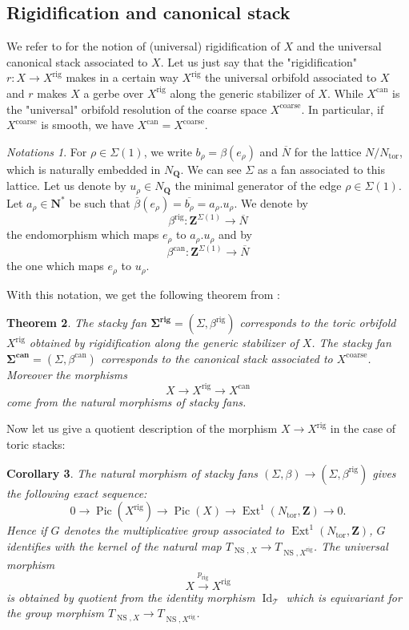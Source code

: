 \documentclass{proc-l}
\newcommand{\Z}{\mathbf{Z}}
\newcommand{\N}{\mathbf{N}}
\newcommand{\Q}{\mathbf{Q}}
\DeclareMathOperator{\Pic}{Pic}
\DeclareMathOperator{\can}{can}
\DeclareMathOperator{\id}{Id}
\DeclareMathOperator{\Ext}{Ext}
\DeclareMathOperator{\NS}{NS}
\DeclareMathOperator{\coarse}{coarse}
\DeclareMathOperator{\tor}{tor}
\DeclareMathOperator{\rig}{rig}
\newcommand{\stackT}{\mathcal{T}}
\newtheorem{theorem}{Theorem}[section]
\newtheorem{cor}[theorem]{Corollary}
\theoremstyle{definition}
\theoremstyle{remark}
\newtheorem{Notations}[theorem]{Notations}
\numberwithin{equation}{section}
\begin{document}
\subsection{Rigidification and canonical stack}

We refer to \cite[section 1.4, section 4.1]{fantechi_toric_stack} for the notion of (universal) rigidification of $X$ and the universal canonical stack associated to $X$. Let us just say that the "rigidification" $r : X \rightarrow X^{\rig}$ makes in a certain way $X^{\rig}$ the universal orbifold associated to $X$ and $r$ makes $X$ a gerbe over $X^{\rig}$ along the generic stabilizer of $X$. While $X^{\can}$ is the "universal" orbifold resolution of the coarse space $X^{\coarse}$. In particular, if $X^{\coarse}$ is smooth, we have $X^{\can} = X^{\coarse}$.

\begin{Notations}\label{notation_stacky_fan_beta}
    For $\rho \in \Sigma(1)$, we write $b_ {\rho} = \beta(e_{\rho})$ and $\overline{N}$ for  the lattice $N / N_{\tor}$, which is naturally embedded in $N_{\Q}$. We can see $\Sigma$ as a fan associated to this lattice. Let us denote by $u_{\rho} \in N_{\Q}$ the minimal generator of the edge $\rho \in \Sigma(1)$. Let $a_{\rho} \in \N^*$ be such that $\overline{\beta}(e_{\rho}) = \overline{b_{\rho}} = a_{\rho} . u_{\rho}$. We denote by $$\beta^{\rig} : \Z^{\Sigma(1)} \rightarrow \overline{N}$$ the endomorphism which maps $e_{\rho}$ to $a_{\rho} . u_{\rho}$ and by $$\beta^{\can} : \Z^{\Sigma(1)} \rightarrow \overline{N}$$ the one which maps $e_{\rho}$ to $ u_{\rho}$.
\end{Notations}

With this notation, we get the following theorem from \cite[Paragraph 7.2]{fantechi_toric_stack}:

\begin{theorem}
    The stacky fan $\mathbf{\Sigma^{\rig}} = (\Sigma,\beta^{\rig})$ corresponds to the toric orbifold $X^{\rig}$ obtained by rigidification along the generic stabilizer of $X$. The stacky fan $\mathbf{\Sigma^{\can}} = (\Sigma,\beta^{\can})$ corresponds to the canonical stack associated to $X^{\coarse}$. Moreover the morphisms $$X \rightarrow X^{\rig} \rightarrow X^{\can} $$ come from the natural morphisms of stacky fans.
\end{theorem}

Now let us give a quotient description of the morphism $X \rightarrow X^{\rig}$ in the case of toric stacks:

\begin{cor}\label{cor_description_map_stack_to_rigidification}
    The natural morphism of stacky fans $(\Sigma,\beta) \rightarrow (\Sigma,\beta^{\rig})$ gives the following exact sequence:
    $$0 \rightarrow \Pic(X^{\rig}) \rightarrow \Pic(X) \rightarrow \Ext^1(N_{\tor},\Z) \rightarrow 0 .$$Hence if $G$ denotes the multiplicative group associated to $\Ext^1(N_{\tor},\Z)$, $G$ identifies with the kernel of the natural map $T_{\NS,X} \rightarrow T_{\NS,X^{\rig}}$. The universal morphism $$X \xrightarrow{p_{\rig}} X^{\rig}$$ is obtained by quotient from the identity morphism $\id_{\stackT}$ which is equivariant for the group morphism $T_{\NS,X} \rightarrow T_{\NS,X^{\rig}}$.
\end{cor}
\end{document}
